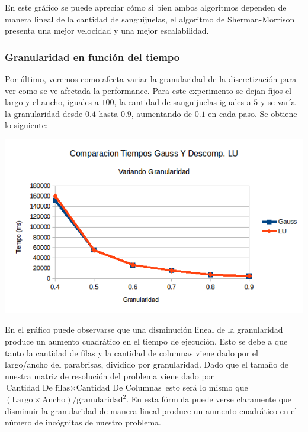 En este gráfico se puede apreciar cómo si bien ambos algoritmos dependen de manera lineal de la cantidad de sanguijuelas, el algoritmo de Sherman-Morrison presenta una mejor velocidad y una mejor escalabilidad.

\subsubsection{Granularidad en función del tiempo}
Por último, veremos como afecta variar la granularidad de la discretización para ver como se ve afectada la performance. Para este experimento se dejan fijos el largo y el ancho, iguales a $100$, la cantidad de sanguijuelas iguales a $5$ y se varía la granularidad desde $0.4$ hasta $0.9$, aumentando de $0.1$ en cada paso. Se obtiene lo siguiente:

\begin{center}
 \includegraphics[width=400pt]{imagenes/testeo/granuGauss.png}
\end{center}

En el gráfico puede observarse que una disminución lineal de la granularidad produce un aumento cuadrático en el tiempo de ejecución. Esto se debe a que tanto la cantidad de filas y la cantidad de columnas viene dado por el largo/ancho del parabrisas, dividido por granularidad. Dado que el tamaño de nuestra matriz de resolución del problema viene dado por $\text{Cantidad De filas} \times \text{Cantidad De Columnas}$ esto será lo mismo que  $(\text{Largo} \times \text{Ancho}) / \text{granularidad}^2$. En esta fórmula puede verse claramente que disminuir la granularidad de manera lineal produce un aumento cuadrático en el número de incógnitas de nuestro problema.

